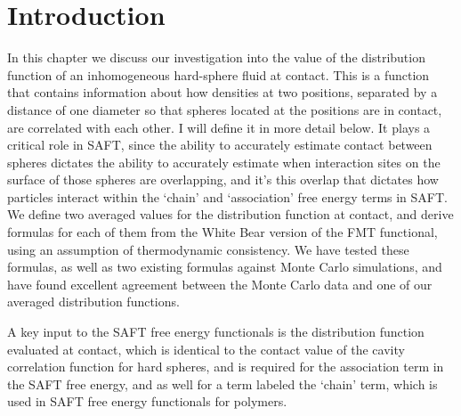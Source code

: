 \section{Introduction}
In this chapter we discuss our investigation into the value of the
distribution function of an inhomogeneous hard-sphere fluid at
contact.  This is a function that contains information about how
densities at two positions, separated by a distance of one diameter so
that spheres located at the positions are in contact, are correlated
with each other.  I will define it in more detail below.  It plays a
critical role in SAFT, since the %
ability to accurately estimate contact between spheres dictates the
ability to accurately estimate when interaction sites on the surface
of those spheres are overlapping, and it's this overlap that dictates
how particles interact within the `chain' and `association' free
energy terms in SAFT.  We define two averaged values for the
distribution function at contact, and derive formulas for each of them
from the White Bear version of the FMT functional, using an assumption
of thermodynamic consistency. We have tested these formulas, as well
as two existing formulas against Monte Carlo simulations, and have
found excellent agreement between the Monte Carlo data and one of our
averaged distribution functions.


A key input to the SAFT free energy functionals is the distribution
function evaluated at contact, which is identical to the contact value
of the cavity correlation function for hard spheres, and is required
for the association term in the SAFT free energy, and as well for a
term labeled the `chain' term, which is used in SAFT free energy
functionals for polymers.

